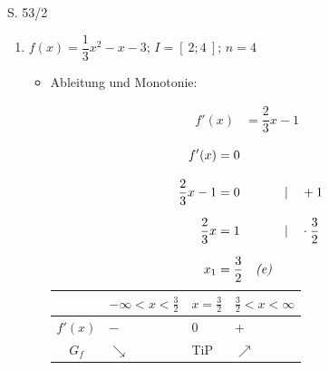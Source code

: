\begin{Exercise}{S. 53/2}{}
\begin{enumerate}[leftmargin=*]
\begin{enumerate}[label=\alph*),leftmargin=*]
{\begin{itemize}[leftmargin=*]
{{
                    }
                    }
            \end{itemize}
            }
        \item [b)] {
            $f(x) = \dfrac{1}{3} x^{2} - x -3$; \quad $I = \left[ \ 2; 4 \  \right]$; \quad $n = 4$ \\
            \begin{itemize}[leftmargin=*]
                \item Ableitung und Monotonie: \\[-2.0ex]{
                    \begin{align*}
                        f'(x) &= \dfrac{2}{3} x - 1 &&
                    \end{align*}
                    \begin{minipage}[t]{0.35\linewidth}
                        \begin{align*}
                            f'(x) &= 0 \\[2.0ex]
                            \dfrac{2}{3} x - 1 &= 0 &&| \quad + 1\\[1.5ex]
                            \dfrac{2}{3} x &= 1 &&| \quad \cdot \frac{3}{2}\\[1.5ex]
                            x_{1} &= \frac{3}{2} \quad \text{\textit{(e)}} &&\\[-1.0ex]
                        \end{align*}
                    \end{minipage}
                    \hfill
                    \begin{minipage}[t]{0.55\linewidth}
                        \vspace{0pt}
                        \begin{tabularx}{0.95\linewidth}{c|X|X|X}
                            & $-\infty < x < \frac{3}{2}$ & $x = \frac{3}{2}$ & $\frac{3}{2} < x < \infty$ \\ \hline
                            $f'(x)$ & $-$ & $0$ & $+$ \\ \hline
                            $G_{f}$ & $\searrow$ & TiP & $\nearrow$ \\           

\end{tabularx}
\end{minipage}}
\end{itemize}}
\end{enumerate}
\end{enumerate}
\end{Exercise}
